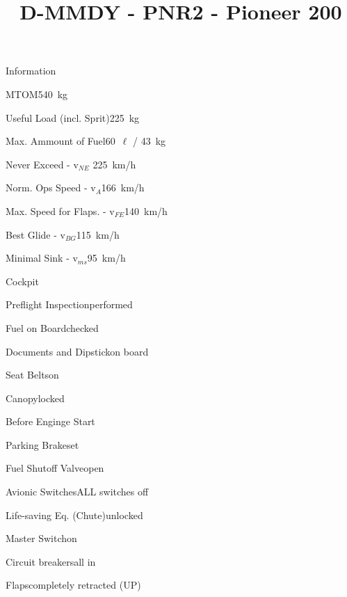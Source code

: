 \def\papersize{4}




\title{D-MMDY  -  PNR2  -  Pioneer 200}

\begin{checklist}{Information}
 	\item{MTOM}{540~kg}
  	\item{Useful Load (incl. Sprit)}{225~kg}
  	\item{Max. Ammount of Fuel}{60~${\ell}$ / 43~kg}
 	  \item{Never Exceed  -  v$_{NE}$ }{ 225~km/h}
	  \item{Norm. Ops Speed  -  v$_{A}$}{166~km/h}
	  \item{Max. Speed for Flaps.  -  v$_{FE}$}{140~km/h}
	  \item{Best Glide  -  v$_{BG}$}{115~km/h}
	  \item{Minimal Sink  -  v$_{ms}$}{95~km/h}
\end{checklist}

\begin{checklist}{Cockpit}
	\item{Preflight Inspection}{performed}
	\item{Fuel on Board}{checked}
	\item{Documents and Dipstick}{on board}
	\item{Seat Belts}{on}
	\item{Canopy}{locked}
\end{checklist}

\begin{checklist}{Before Enginge Start}
	\item{Parking Brake}{set}
	\item{Fuel Shutoff Valve}{open}
	\item{Avionic Switches}{ALL switches off}
	\item{Life-saving Eq. (Chute)}{unlocked}
	\item{Master Switch}{on}
	\item{Circuit breakers}{all in}
	\item{Flaps}{completely retracted (UP)}
\end{checklist}


